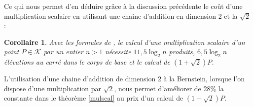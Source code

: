 \documentclass[a4paper]{article}
\newtheorem{corollaire}[theoreme]{Corollaire}
\theoremstyle{definition}
\theoremstyle{remark}
\numberwithin{equation}{section}
\begin{document}
Ce qui nous permet d'en déduire grâce à la discussion précédente le coût d'une multiplication scalaire en utilisant une chaine d'addition en dimension 2 et la $\sqrt{2}$ :
\begin{corollaire}
Avec les formules de \citep{gaudry}, le calcul d'une multiplication scalaire d'un point $P \in \mathcal{K}$ par un entier $n > 1$ nécessite $11,5\log_2 n$ produits, $6,5\log_2 n$ élévations au carré dans le corps de base et le calcul de $(1+\sqrt{2})P$.
\end{corollaire}

L'utilisation d'une chaine d'addition de dimension 2 à la Bernstein, lorsque l'on dispose d'une multiplication par $\sqrt{2}$, nous permet d'améliorer de 28\% la constante dans le théorème \ref{mulscal} au prix d'un calcul de $(1+\sqrt{2})P$.
\end{document}
